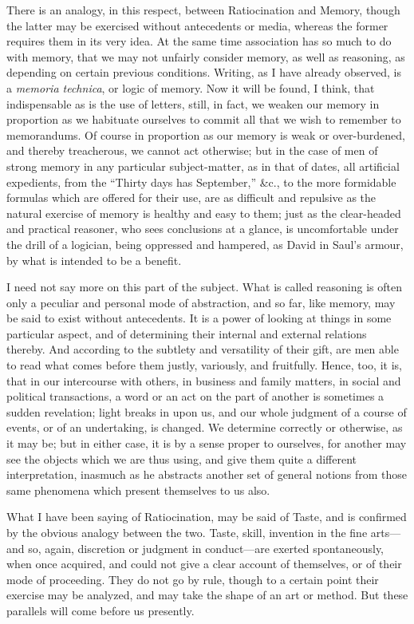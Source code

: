 There is an analogy, in this respect, between Ratiocination and Memory, though the latter may be exercised without antecedents or
media, whereas the former requires them in its very idea. At the same
time association has so much to do with memory, that we may not
unfairly consider memory, as well as reasoning, as depending on
certain previous conditions. Writing, as I have already observed, is a
\emph{memoria technica}, or logic of memory. Now it will be found, I
think, that indispensable as is the use of letters, still, in fact, we
weaken our memory in proportion as we habituate ourselves to commit
all that we wish to remember to memorandums. Of course in proportion
as our memory is weak or over-burdened, and thereby treacherous, we
cannot act otherwise; but in the case of men of strong memory in any
particular subject-matter, as in that of dates, all artificial
expedients, from the ``Thirty days has September,'' \&c.,
to the more formidable formulas which are offered for their use, are
as difficult and repulsive as the natural exercise of memory is
healthy and easy to them; just as the clear-headed and practical
reasoner, who sees conclusions at a glance, is uncomfortable under the
drill of a logician, being oppressed and hampered, as David in Saul's
armour, by what is intended to be a benefit.

I need not say more on this part of the subject. What is called
reasoning is often only a peculiar and personal mode of abstraction,
and so far, like memory, may be said to exist without antecedents. It
is a power of looking at things in some particular aspect, and of
determining their internal and external relations thereby. And
according to the subtlety and versatility of their gift, are men able
to read what comes before them justly, variously, and
fruitfully. Hence, too, it is, that in our intercourse with others, in
business and family matters, in social and political transactions, a
word or an act on the part of another is sometimes a sudden
revelation; light breaks in upon us, and our whole judgment of a
course of events, or of an undertaking, is changed. We determine
correctly or otherwise, as it may be; but in either case, it is by a
sense proper to ourselves, for another may see the objects which we
are thus using, and give them quite a different interpretation,
inasmuch as he abstracts another set of general notions from those
same phenomena which present themselves to us also.

What I have been saying of Ratiocination, may be said of Taste, and
is confirmed by the obvious analogy between the two. Taste, skill,
invention in the fine arts—and so, again, discretion or judgment in
conduct—are exerted spontaneously, when once acquired, and could not
give a clear account of themselves, or of their mode of proceeding.
They do not go by rule, though to a certain point their exercise may
be analyzed, and may take the shape of an art or method. But these
parallels will come before us presently.

